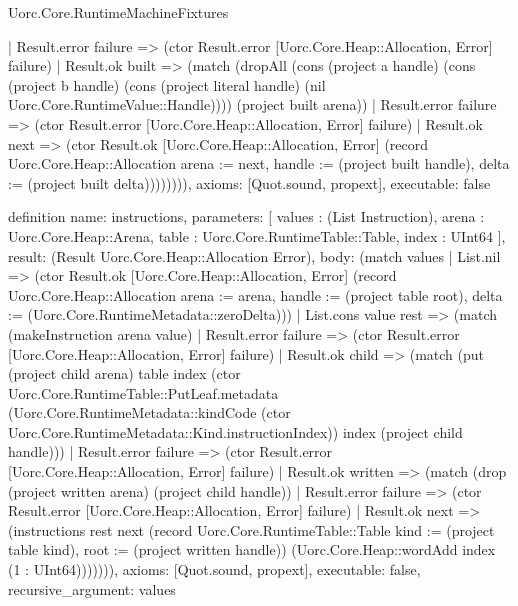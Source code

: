 \begin{lexlean}{Uorc.Core.RuntimeMachineFixtures}
\begin{semanticmodule}
{          | Result.error failure => (ctor Result.error [Uorc.Core.Heap::Allocation, Error] failure)
          | Result.ok built => (match (dropAll (cons (project a handle) (cons (project b handle) (cons (project literal handle) (nil Uorc.Core.RuntimeValue::Handle)))) (project built arena))
            | Result.error failure => (ctor Result.error [Uorc.Core.Heap::Allocation, Error] failure)
            | Result.ok next => (ctor Result.ok [Uorc.Core.Heap::Allocation, Error] (record Uorc.Core.Heap::Allocation {arena := next, handle := (project built handle), delta := (project built delta)}))))))),
  axioms: [Quot.sound, propext],
  executable: false
}

definition{
  name: instructions,
  parameters: [
    values : (List Instruction),
    arena : Uorc.Core.Heap::Arena,
    table : Uorc.Core.RuntimeTable::Table,
    index : UInt64
  ],
  result: (Result Uorc.Core.Heap::Allocation Error),
  body: (match values
    | List.nil => (ctor Result.ok [Uorc.Core.Heap::Allocation, Error] (record Uorc.Core.Heap::Allocation {arena := arena, handle := (project table root), delta := (Uorc.Core.RuntimeMetadata::zeroDelta)}))
    | List.cons value rest => (match (makeInstruction arena value)
      | Result.error failure => (ctor Result.error [Uorc.Core.Heap::Allocation, Error] failure)
      | Result.ok child => (match (put (project child arena) table index (ctor Uorc.Core.RuntimeTable::PutLeaf.metadata (Uorc.Core.RuntimeMetadata::kindCode (ctor Uorc.Core.RuntimeMetadata::Kind.instructionIndex)) index (project child handle)))
        | Result.error failure => (ctor Result.error [Uorc.Core.Heap::Allocation, Error] failure)
        | Result.ok written => (match (drop (project written arena) (project child handle))
          | Result.error failure => (ctor Result.error [Uorc.Core.Heap::Allocation, Error] failure)
          | Result.ok next => (instructions rest next (record Uorc.Core.RuntimeTable::Table {kind := (project table kind), root := (project written handle)}) (Uorc.Core.Heap::wordAdd index (1 : UInt64))))))),
  axioms: [Quot.sound, propext],
  executable: false,
  recursive_argument: values
}


\end{semanticmodule}
\end{lexlean}
